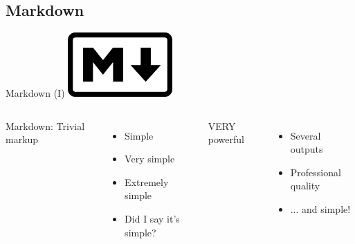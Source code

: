\documentclass[10pt,compress]{beamer} %
\begin{document}
\subsection{Markdown}
\begin{frame}[fragile]{Markdown (I)}
 	\centering \includegraphics[width=0.3\textwidth]{figs/logo-md.png}
	\bigskip

	\begin{columns}
	Markdown: Trivial markup
	\begin{itemize}
		\item Simple
		\item Very simple
		\item Extremely simple
		\item Did I say it's simple?
	\end{itemize}

	VERY powerful
	\begin{itemize}
		\item Several outputs
		\item Professional quality
		\item ... and simple!
	\end{itemize}
	\end{columns}


\end{frame}
\end{document}
